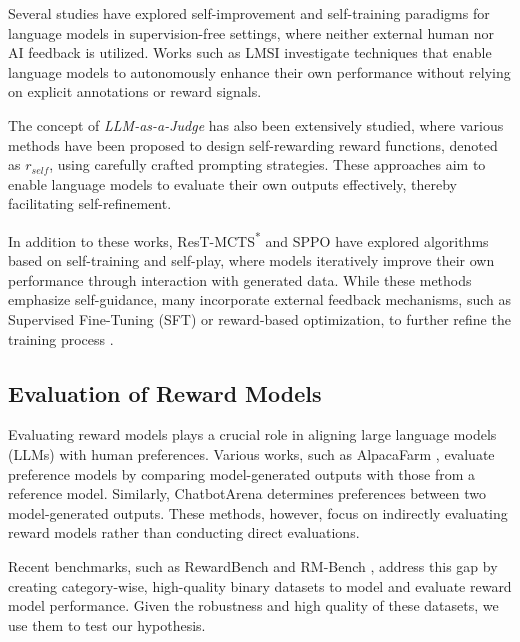 Several studies have explored self-improvement and self-training paradigms for language models in supervision-free settings, where neither external human nor AI feedback is utilized. Works such as LMSI \citep{huang2022largelanguagemodelsselfimprove, huang2024selfimprovementlanguagemodelssharpening} investigate techniques that enable language models to autonomously enhance their own performance without relying on explicit annotations or reward signals.

The concept of \textit{LLM-as-a-Judge} \citep{gu2024surveyllmasajudge,ye2024beyond,dong-etal-2024-llm,li2024dissecting} has also been extensively studied, where various methods have been proposed to design self-rewarding reward functions, denoted as $r_{self}$, using carefully crafted prompting strategies. These approaches aim to enable language models to evaluate their own outputs effectively, thereby facilitating self-refinement.

In addition to these works, ResT-MCTS\textsuperscript{*} \citep{zhang2024rest} and SPPO \citep{wu2024self} have explored algorithms based on self-training and self-play, where models iteratively improve their own performance through interaction with generated data. While these methods emphasize self-guidance, many incorporate external feedback mechanisms, such as Supervised Fine-Tuning (SFT) or reward-based optimization, to further refine the training process \cite{ouyang2022training}. 

\subsection{Evaluation of Reward Models}

Evaluating reward models plays a crucial role in aligning large language models (LLMs) with human preferences. Various works, such as AlpacaFarm \citep{dubois2024alpacafarmsimulationframeworkmethods}, evaluate preference models by comparing model-generated outputs with those from a reference model. Similarly, ChatbotArena \citep{chiang2024chatbotarenaopenplatform} determines preferences between two model-generated outputs. These methods, however, focus on indirectly evaluating reward models rather than conducting direct evaluations.

Recent benchmarks, such as RewardBench \citep{lambert2024rewardbenchevaluatingrewardmodels} and RM-Bench \citep{liu2024rmbenchbenchmarkingrewardmodels}, address this gap by creating category-wise, high-quality binary datasets to model and evaluate reward model performance. Given the robustness and high quality of these datasets, we use them to test our hypothesis.

